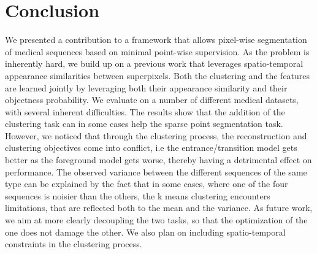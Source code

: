 \section{Conclusion}
\label{sec:conclusion}

We presented a contribution to a framework that allows pixel-wise segmentation of medical sequences based on minimal point-wise supervision.
As the problem is inherently hard, we build up on a previous work that leverages spatio-temporal appearance similarities between superpixels.
Both the clustering and the features are learned jointly by leveraging both their appearance similarity and their objectness probability.
We evaluate on a number of different medical datasets, with several inherent difficulties.
The results show that the addition of the clustering task can in some cases help the sparse point segmentation task.
However, we noticed that through the clustering process, the reconstruction and clustering objectives come into conflict, i.e the entrance/transition model gets better as the foreground model gets worse, thereby having a detrimental effect on performance.
The observed variance between the different sequences of the same type can be explained by the fact that in some cases, where one of the four sequences is noisier than the others, the k means clustering encounters limitations, that are reflected both to the mean and the variance. 
As future work, we aim at more clearly decoupling the two tasks, so that the optimization of the one does not damage the other.
We also plan on including spatio-temporal constraints in the clustering process.

